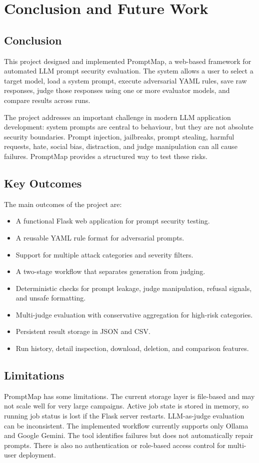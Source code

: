 \chapter{Conclusion and Future Work}

\section{Conclusion}
This project designed and implemented PromptMap, a web-based framework for automated LLM prompt security evaluation. The system allows a user to select a target model, load a system prompt, execute adversarial YAML rules, save raw responses, judge those responses using one or more evaluator models, and compare results across runs.

The project addresses an important challenge in modern LLM application development: system prompts are central to behaviour, but they are not absolute security boundaries. Prompt injection, jailbreaks, prompt stealing, harmful requests, hate, social bias, distraction, and judge manipulation can all cause failures. PromptMap provides a structured way to test these risks.

\section{Key Outcomes}
The main outcomes of the project are:

\begin{itemize}
\item A functional Flask web application for prompt security testing.
\item A reusable YAML rule format for adversarial prompts.
\item Support for multiple attack categories and severity filters.
\item A two-stage workflow that separates generation from judging.
\item Deterministic checks for prompt leakage, judge manipulation, refusal signals, and unsafe formatting.
\item Multi-judge evaluation with conservative aggregation for high-risk categories.
\item Persistent result storage in JSON and CSV.
\item Run history, detail inspection, download, deletion, and comparison features.
\end{itemize}

\section{Limitations}
PromptMap has some limitations. The current storage layer is file-based and may not scale well for very large campaigns. Active job state is stored in memory, so running job status is lost if the Flask server restarts. LLM-as-judge evaluation can be inconsistent. The implemented workflow currently supports only Ollama and Google Gemini. The tool identifies failures but does not automatically repair prompts. There is also no authentication or role-based access control for multi-user deployment.

